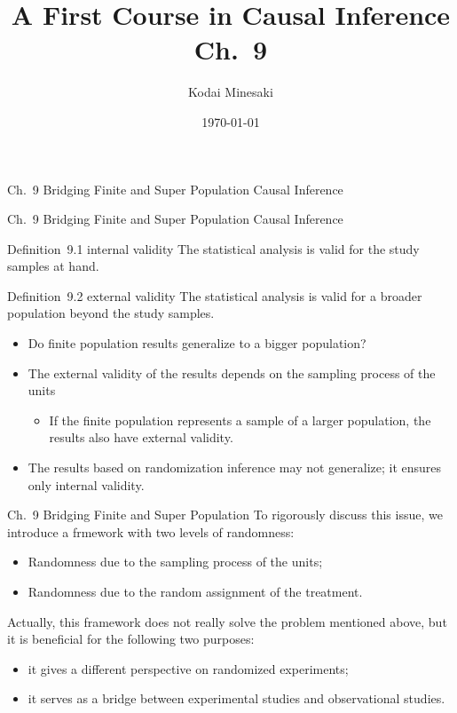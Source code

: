 \documentclass[aspectratio=169, 12pt]{beamer}
\title[]{A First Course in Causal Inference Ch.~9}
\author[Kodai Minesaki]{Kodai Minesaki}
\institute[Faculty of Engineering, The University of Tokyo]{Faculty of Engineering, The University of Tokyo}
\date{\today}
\begin{document}
\begin{frame}
\titlepage
\end{frame}


\begin{frame}

  {
    \large
    Ch.~9 Bridging Finite and Super Population Causal Inference
  }
  
\end{frame}

\begin{frame}{Ch.~9 Bridging Finite and Super Population Causal Inference}
  \begin{keybox}{Definition~9.1 internal validity}
    The statistical analysis is valid for the study samples at hand.
  \end{keybox}
  \begin{keybox}{Definition~9.2 external validity}
    The statistical analysis is valid for a broader population beyond the study samples. 
  \end{keybox}
  \begin{itemize}
    \item Do finite population results generalize to a bigger population?
    \item The external validity of the results depends on the sampling process of the units
    \begin{itemize}
      \item If the finite population represents a sample of a larger population, the results also have external validity.
    \end{itemize}
    \item The results based on randomization inference may not generalize; it ensures only internal validity. 
  \end{itemize}
  
\end{frame}

\begin{frame}{Ch.~9 Bridging Finite and Super Population}
  To rigorously discuss this issue, we introduce a frmework with two levels of randomness:
  \begin{itemize}
    \item Randomness due to the sampling process of the units;
    \item Randomness due to the random assignment of the treatment.
  \end{itemize}
  Actually, this framework does not really solve the problem mentioned above, but it is beneficial for the following two purposes:
  \begin{itemize}
    \item it gives a different perspective on randomized experiments;
    \item it serves as a bridge between experimental studies and observational studies.
  \end{itemize}
\end{frame}
\end{document}
